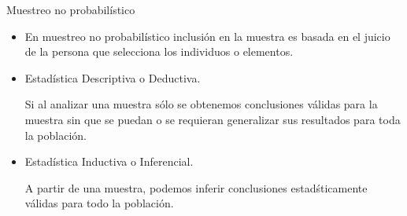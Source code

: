 \documentclass{beamer}
\begin{document}
\begin{frame}{Muestreo no probabilístico}
\begin{itemize}
 \item    En muestreo no probabilístico inclusión en la muestra es basada en el juicio de la persona que selecciona los individuos o elementos.
\end{itemize}
\end{frame}




\begin{frame}{}
   \begin{itemize}
       \item {\color{blue}Estad\'istica Descriptiva o Deductiva.}  
       
       Si al analizar una muestra s\'olo se
obtenemos conclusiones v\'alidas para la muestra sin que se puedan o
se requieran generalizar sus resultados para toda la población.
\item {\color{blue}Estad\'istica Inductiva o Inferencial.} 

A partir de una muestra, podemos inferir conclusiones
estad\'sticamente v\'alidas para todo la población.
   \end{itemize} 
\end{frame}
\end{document}
